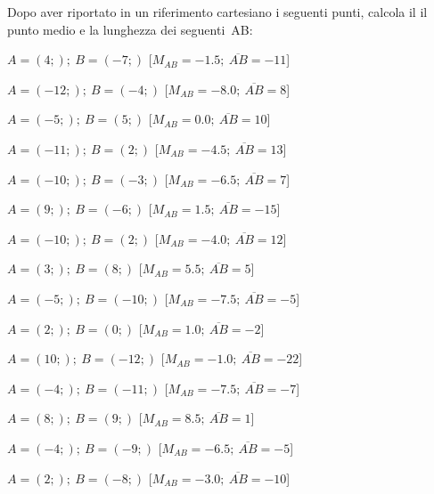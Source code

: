 \begin{esercizio}\label{ese:03.1}
Dopo aver riportato in un riferimento cartesiano i seguenti punti,
calcola il il punto medio e la lunghezza dei seguenti~AB:
 \begin{enumeratea}
  \item  $ A=(4;); ~B=(-7;)$ \hfill [$M_{AB}=-1.5; ~\overline{AB}=-11$]
  \item  $ A=(-12;); ~B=(-4;)$ \hfill [$M_{AB}=-8.0; ~\overline{AB}=8$]
  \item  $ A=(-5;); ~B=(5;)$ \hfill [$M_{AB}=0.0; ~\overline{AB}=10$]
  \item  $ A=(-11;); ~B=(2;)$ \hfill [$M_{AB}=-4.5; ~\overline{AB}=13$]
  \item  $ A=(-10;); ~B=(-3;)$ \hfill [$M_{AB}=-6.5; ~\overline{AB}=7$]
  \item  $ A=(9;); ~B=(-6;)$ \hfill [$M_{AB}=1.5; ~\overline{AB}=-15$]
  \item  $ A=(-10;); ~B=(2;)$ \hfill [$M_{AB}=-4.0; ~\overline{AB}=12$]
  \item  $ A=(3;); ~B=(8;)$ \hfill [$M_{AB}=5.5; ~\overline{AB}=5$]
  \item  $ A=(-5;); ~B=(-10;)$ \hfill [$M_{AB}=-7.5; ~\overline{AB}=-5$]
  \item  $ A=(2;); ~B=(0;)$ \hfill [$M_{AB}=1.0; ~\overline{AB}=-2$]
  \item  $ A=(10;); ~B=(-12;)$ \hfill [$M_{AB}=-1.0; ~\overline{AB}=-22$]
  \item  $ A=(-4;); ~B=(-11;)$ \hfill [$M_{AB}=-7.5; ~\overline{AB}=-7$]
  \item  $ A=(8;); ~B=(9;)$ \hfill [$M_{AB}=8.5; ~\overline{AB}=1$]
  \item  $ A=(-4;); ~B=(-9;)$ \hfill [$M_{AB}=-6.5; ~\overline{AB}=-5$]
  \item  $ A=(2;); ~B=(-8;)$ \hfill [$M_{AB}=-3.0; ~\overline{AB}=-10$]
 \end{enumeratea}
\end{esercizio}

